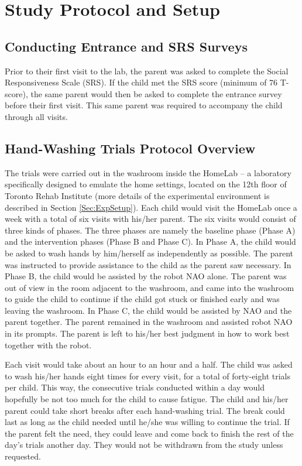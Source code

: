 \section{Study Protocol and Setup}
\label{sec:StudyProtocol}

\subsection{Conducting Entrance and SRS Surveys}
Prior to their first visit to the lab, the parent was asked to complete the Social Responsiveness Scale (SRS). If the child met the SRS score (minimum of 76 T-score), the same parent would then be asked to complete the entrance survey before their first visit. This same parent was required to accompany the child through all visits.


\subsection{Hand-Washing Trials Protocol Overview}
\label{sec:ProtocolOverview}
The trials were carried out in the washroom inside the HomeLab -- a laboratory specifically designed to emulate the home settings, located on the 12th floor of Toronto Rehab Institute (more details of the experimental environment is described in Section \ref{Sec:ExpSetup}).  Each child would visit the HomeLab once a week with a total of six visits with his/her parent. The six visits would consist of three kinds of phases. The three phases are namely the baseline phase (Phase A) and the intervention phases (Phase B and Phase C). In Phase A, the child would be asked to wash hands by him/herself as independently as possible. The parent was instructed to provide assistance to the child as the parent saw necessary.  In Phase B, the child would be assisted by the robot NAO alone.  The parent was out of view in the room adjacent to the washroom, and came into the washroom to guide the child to continue if the child got stuck or finished early and was leaving the washroom.  In Phase C, the child would be assisted by NAO and the parent together.  The parent remained in the washroom and assisted robot NAO in its prompts.  The parent is left to his/her best judgment in how to work best together with the robot.

Each visit would take about an hour to an hour and a half. The child was asked to wash his/her hands eight times for every visit, for a total of forty-eight trials per child.  This way, the consecutive trials conducted within a day would hopefully be not too much for the child to cause fatigue.  The child and his/her parent could take short breaks after each hand-washing trial.  The break could last as long as the child needed until he/she was willing to continue the trial. If the parent felt the need, they could leave and come back to finish the rest of the day's trials another day. They would not be withdrawn from the study unless requested.

